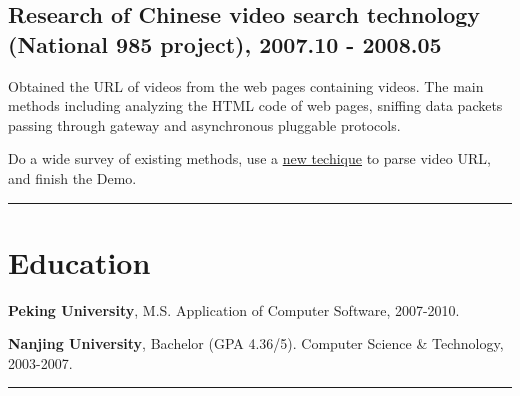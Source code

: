 \documentclass[letterpaper]{article}
\renewenvironment{itemize}{
\begin{list}{*}{
    \setlength{\leftmargin}{1.5em}
    \setlength{\itemsep}{0pt}
  }
}{
  \end{list}
}
\begin{document}

\subsection*{\textbf{Research of Chinese video search technology (National 985 project), 2007.10 - 2008.05}}
\begin{itemize}
\item Obtained the URL of videos from the web pages containing videos. The main methods including analyzing the HTML code of web pages, sniffing data packets passing through gateway and asynchronous pluggable protocols.
\item Do a wide survey of existing methods, use a \href{https://msdn.microsoft.com/en-us/library/aa767743%28v=vs.85%29.aspx}{new techique} to parse video URL, and finish the Demo.
\end{itemize}


\rule{16.8cm}{0.1em}

\vspace{-1em}
\section*{Education}
\begin{itemize}
	\item \textbf{Peking University}, M.S. Application of Computer Software, 2007-2010.
	\item \textbf{Nanjing University}, Bachelor (GPA 4.36/5). Computer Science \& Technology, 2003-2007.
\end{itemize}

\rule{16.8cm}{0.1em}

\vspace{-1em}
\end{document}
